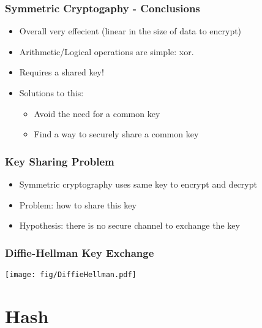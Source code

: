 \documentclass[
hyperref={pdfpagelabels=false}
,xcolor=table
]
{beamer}
\newcommand{\plus}{{\texttt{[image: plus.png]}}}
\newcommand{\minus}{{\texttt{[image: minus.png]}}}
\begin{document}
\begin{frame}
  \frametitle{Symmetric Cryptogaphy - Conclusions}

  \begin{itemize}
  \item[\plus] Overall very effecient (linear in the size of data to encrypt)
  \item[\plus] Arithmetic/Logical operations are simple: xor. 
  \item[\minus] Requires a shared key! 
  \item Solutions to this:
    \begin{itemize}
    \item Avoid the need for a common key
    \item Find a way to securely share a common key
    \end{itemize}
  \end{itemize}
\end{frame}






\begin{frame}
  \frametitle{Key Sharing Problem}
  \begin{itemize}
  \item Symmetric cryptography uses same key to encrypt and decrypt
  \item Problem: how to share this key
  \item Hypothesis: there is no secure channel to exchange the key
  \end{itemize}
\end{frame}


\begin{frame}
  \frametitle{Diffie-Hellman Key Exchange}
  \begin{center}
    \texttt{[image: fig/DiffieHellman.pdf]}
  \end{center}
\end{frame}



\section{Hash}
\end{document}
